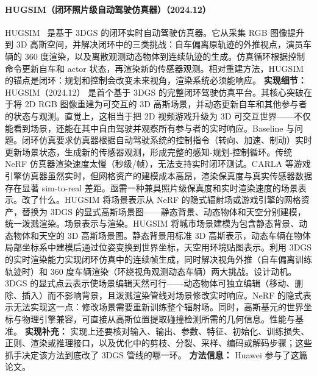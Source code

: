\paragraph{HUGSIM（闭环照片级自动驾驶仿真器）（2024.12）}
HUGSIM~\cite{2412_01718} 是基于 3DGS 的闭环实时自动驾驶仿真器。它从采集 RGB 图像提升到 3D 高斯空间，并解决闭环中的三类挑战：自车偏离原轨迹的外推视点，演员车辆的 360 度渲染，以及离散观测动态物体到连续轨迹的生成。仿真循环根据控制命令更新自车和 actor 状态，再渲染新的传感器观测。相对重建方法，HUGSIM 的锚点是闭环：规划和控制会改变未来视角，渲染系统必须能响应。
\textbf{实现细节：} HUGSIM（2024.12） 是首个基于 3DGS 的完整闭环驾驶仿真平台。其核心突破在于将 2D RGB 图像重建为可交互的 3D 高斯场景，并动态更新自车和其他参与者的状态与观测。直觉上，这相当于把 2D 视频游戏升级为 3D 可交互世界——不仅能看到场景，还能在其中自由驾驶并观察所有参与者的实时响应。Baseline 与问题。闭环仿真要求仿真器根据自动驾驶系统的控制指令（转向、加速、制动）实时更新场景状态，生成新的传感器观测，形成完整的感知-规划-控制循环。传统 NeRF 仿真器渲染速度太慢（秒级/帧），无法支持实时闭环测试。CARLA 等游戏引擎仿真器虽然实时，但网格资产的建模成本高昂，渲染保真度与真实传感器数据存在显著 sim-to-real 差距。亟需一种兼具照片级保真度和实时渲染速度的场景表示。改了什么。HUGSIM 将场景表示从 NeRF 的隐式辐射场或游戏引擎的网格资产，替换为 3DGS 的显式高斯场景图——静态背景、动态物体和天空分别建模，统一泼溅渲染。场景表示与渲染。HUGSIM 将城市场景建模为包含静态背景、动态物体和天空的 3D 高斯场景图。静态背景用标准 3D 高斯表示，动态车辆在物体局部坐标系中建模后通过位姿变换到世界坐标，天空用环境贴图表示。利用 3DGS 的实时渲染能力实现闭环仿真中的连续帧生成，同时解决视角外推（自车偏离训练轨迹时）和 360 度车辆渲染（环绕视角观测动态车辆）两大挑战。设计动机。3DGS 的显式点云表示使场景编辑天然可行——动态物体可独立编辑（移动、删除、插入）而不影响背景，且泼溅渲染管线对场景修改实时响应。NeRF 的隐式表示无法实现这一点：修改场景需要重新训练整个辐射场。同时，高斯基元的世界坐标与物理引擎兼容，可直接从高斯位置提取碰撞检测所需的几何信息。性能与基准。
\textbf{实现补充：} 实现上还要核对输入、输出、参数、特征、初始化、训练损失、正则、渲染或推理接口，以及优化中的剪枝、分裂、采样、编码或解码步骤；这些抓手决定该方法到底改了 3DGS 管线的哪一环。
\textbf{方法信息：} Huawei 参与了这篇论文。



